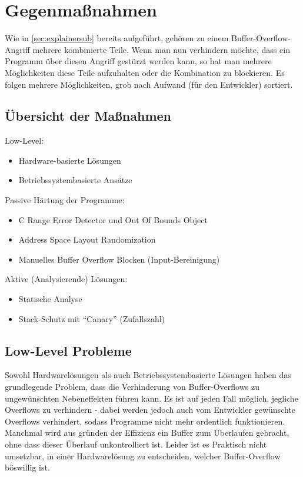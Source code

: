 \pagebreak
\section{Gegenmaßnahmen}
Wie in \autoref{sec:explainersub} bereits aufgeführt,
gehören zu einem Buffer-Overflow-Angriff mehrere kombinierte Teile. Wenn
man nun verhindern möchte, dass ein Programm über diesen Angriff gestürzt werden
kann, so hat man mehrere Möglichkeiten diese Teile aufzuhalten oder die Kombination
zu blockieren. \cite{Werthmann2006SurveyOB} Es folgen mehrere Möglichkeiten, grob nach Aufwand (für den Entwickler) sortiert.
\subsection{Übersicht der Maßnahmen}
Low-Level:
\begin{itemize}
    \item Hardware-basierte Lösungen
    \item Betriebssystembasierte Ansätze
\end{itemize}
Passive Härtung der Programme:
\begin{itemize}
    \item C Range Error Detector und Out Of Bounds Object
    \item Address Space Layout Randomization
    \item Manuelles Buffer Overflow Blocken (Input-Bereinigung)
\end{itemize}
Aktive (Analysierende) Lösungen:
\begin{itemize}
    \item Statische Analyse
    \item Stack-Schutz mit ``Canary'' (Zufallszahl)
\end{itemize}

\subsection{Low-Level Probleme}
Sowohl Hardwarelösungen als auch Betriebssystembasierte Lösungen haben
das grundlegende Problem, dass die Verhinderung von Buffer-Overflows zu
ungewünschten Nebeneffekten führen kann. Es ist auf jeden Fall möglich,
jegliche Overflows zu verhindern - dabei werden jedoch auch vom
Entwickler gewünschte Overflows verhindert, sodass Programme nicht mehr
ordentlich funktionieren. Manchmal wird aus gründen der Effizienz ein
Buffer zum Überlaufen gebracht, ohne dass dieser Überlauf unkontrolliert
ist. Leider ist es Praktisch nicht umsetzbar, in einer Hardwarelösung
zu entscheiden, welcher Buffer-Overflow böswillig ist.


